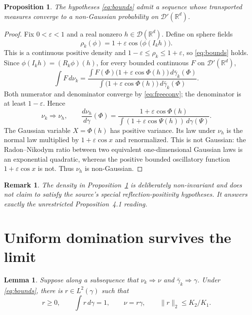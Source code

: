 \documentclass[11pt]{article}
\newtheorem{lemma}[theorem]{Lemma}
\newtheorem{proposition}[theorem]{Proposition}
\newtheorem{remark}[theorem]{Remark}
\newcommand{\R}{\mathbb R}
\newcommand{\D}{\mathcal D}
\newcommand{\eps}{\varepsilon}
\begin{document}
\begin{proposition}\label{prop:tilt}
The hypotheses \eqref{eq:bounds} admit a sequence whose transported measures
converge to a non-Gaussian probability on $\D'(\R^d)$.
\end{proposition}

\begin{proof}
Fix $0<\eps<1$ and a real nonzero $h\in\D(\R^d)$.  Define on sphere fields
\[
 \rho_k(\phi)=1+\eps\cos\bigl(\phi(I_kh)\bigr).
\]
This is a continuous positive density and
$1-\eps\le\rho_k\le1+\eps$, so \eqref{eq:bounds} holds.  Since
$\phi(I_kh)=(R_k\phi)(h)$, for every bounded continuous $F$ on
$\D'(\R^d)$,
\[
 \int F\,d\nu_k
 =\frac{\displaystyle\int F(\Phi)
       \bigl(1+\eps\cos\Phi(h)\bigr)\,d\bar\gamma_k(\Phi)}
       {\displaystyle\int
       \bigl(1+\eps\cos\Phi(h)\bigr)\,d\bar\gamma_k(\Phi)}.
\]
Both numerator and denominator converge by \eqref{eq:freeconv}; the
denominator is at least $1-\eps$.  Hence
\begin{equation}\label{eq:tiltlimit}
 \nu_k\Longrightarrow\nu_h,
 \qquad
 \frac{d\nu_h}{d\gamma}(\Phi)
 =\frac{1+\eps\cos\Phi(h)}
 {\int(1+\eps\cos\Psi(h))\,d\gamma(\Psi)}.
\end{equation}
The Gaussian variable $X=\Phi(h)$ has positive variance.  Its law under
$\nu_h$ is the normal law multiplied by $1+\eps\cos x$ and renormalized.
This is not Gaussian: the Radon--Nikodym ratio between two equivalent
one-dimensional Gaussian laws is an exponential quadratic, whereas the
positive bounded oscillatory function $1+\eps\cos x$ is not.  Thus $\nu_h$
is non-Gaussian.
\end{proof}

\begin{remark}
The density in Proposition~\ref{prop:tilt} is deliberately non-invariant and
does not claim to satisfy the source's special reflection-positivity
hypotheses.  It answers exactly the unrestricted Proposition~4.1 reading.
\end{remark}

\section{Uniform domination survives the limit}

\begin{lemma}\label{lem:domination}
Suppose along a subsequence that $\nu_k\Rightarrow\nu$ and
$\bar\gamma_k\Rightarrow\gamma$.  Under \eqref{eq:bounds}, there is
$r\in L^2(\gamma)$ such that
\[
 r\ge0,\qquad \int r\,d\gamma=1,\qquad \nu=r\gamma,
 \qquad \|r\|_2\le K_2/K_1.
\]
\end{lemma}
\end{document}
